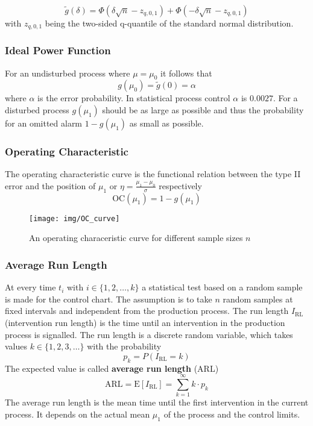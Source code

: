 \documentclass[11pt]{article}
\theoremstyle{definition}
\newcommand*\ev[1]{\mathrel{\text{E}\left[#1\right]}}
\begin{document}
\begin{equation*}
	\tilde{g}(\delta) = \varPhi(\delta\sqrt{n} - z_{q,0,1}) + \varPhi(-\delta\sqrt{n} - z_{q,0,1})
\end{equation*}
with $z_{q,0,1}$ being the two-sided q-quantile of the standard normal distribution.

\subsubsection{Ideal Power Function}
For an undisturbed process where $\mu = \mu_0$ it follows that
\begin{equation*}
	g(\mu_0) = \tilde{g}(0) = \alpha
\end{equation*}
where $\alpha$ is the error probability. In statistical process control $\alpha$ is $0.0027$. For a disturbed process $g(\mu_1)$ should be as large as possible and thus the probability for an omitted alarm $1-g(\mu_1)$ as small as possible. 

\subsubsection{Operating Characteristic}
The operating characteristic curve is the functional relation between the type II error and the position of $\mu_1$ or $\eta = \frac{\mu_1 - \mu_0}{\sigma}$ respectively
\begin{equation*}
	\text{OC}(\mu_1) = 1 - g(\mu_1)
\end{equation*}

\begin{figure}[H]
	\centering
	\texttt{[image: img/OC\_curve]}
	\caption{An operating characeristic curve for different sample sizes $n$}
	\label{fig:occurve}
\end{figure}

\subsubsection{Average Run Length}
At every time $t_i$ with $i\in\{1,2,\dots,k\}$ a statistical test based on a random sample is made for the control chart. The assumption is to take $n$ random samples at fixed intervals and independent from the production process. The run length $I_{\text{RL}}$ (intervention run length) is the time until an intervention in the production process is signalled. The run length is a discrete random variable, which takes values $k\in\{1,2,3,\dots\}$ with the probability
\begin{equation*}
	p_k = P(I_{\text{RL}} = k)
\end{equation*}
The expected value is called \textbf{average run length} (ARL)
\begin{equation*}
	\text{ARL} = \ev{I_{\text{RL}}} = \sum_{k=1}^{\infty} k\cdot p_k
\end{equation*}
The average run length is the mean time until the first intervention in the current process. It depends on the actual mean $\mu_1$ of the process and the control limits.
\end{document}
